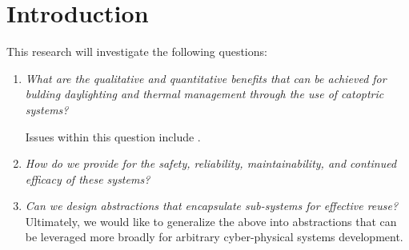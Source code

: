 \section{Introduction}
\label{sec:intro}




This research will investigate the following questions:
\begin{enumerate}

\item \emph{What are the qualitative and quantitative benefits
that can be achieved for bulding daylighting and thermal management
through the use of catoptric systems?}

Issues within this question include .

\item \emph{How do we provide for the safety, reliability, maintainability, and
continued efficacy of these systems?}

\item \emph{Can we design abstractions that encapsulate sub-systems for
effective reuse?}
Ultimately, we would like to generalize the above into abstractions that can be
leveraged more broadly for arbitrary cyber-physical systems development.

\end{enumerate}

